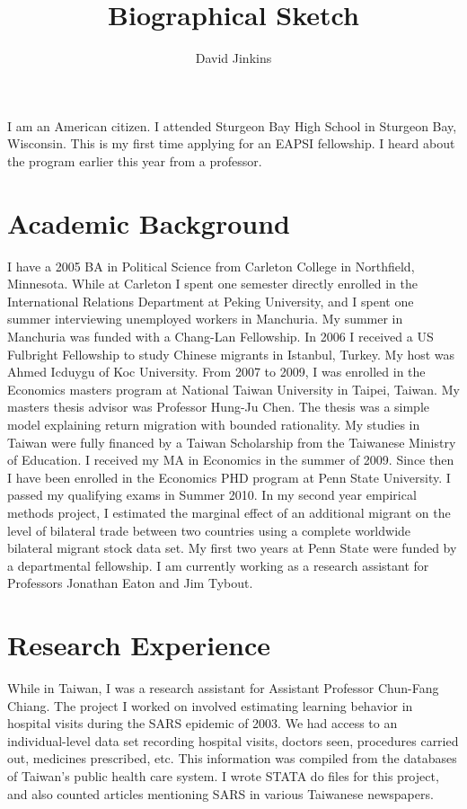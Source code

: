 \documentclass[a4paper,10pt]{article}
\title{Biographical Sketch}
\author{David Jinkins}
\begin{document}
\maketitle

I am an American citizen.  I attended Sturgeon Bay High School in Sturgeon Bay, Wisconsin.  This is my first time applying for an EAPSI fellowship.  I heard about the program earlier this year from a professor.    
\section*{Academic Background}
I have a 2005 BA in Political Science from Carleton College in Northfield, Minnesota.  While at Carleton I spent one semester directly enrolled in the International Relations Department at Peking University, and I spent one summer interviewing unemployed workers in Manchuria.  My summer in Manchuria was funded with a Chang-Lan Fellowship.  In 2006 I received a US Fulbright Fellowship to study Chinese migrants in Istanbul, Turkey.  My host was Ahmed Icduygu of Koc University.  From 2007 to 2009, I was enrolled in the Economics masters program at National Taiwan University in Taipei, Taiwan.  My masters thesis advisor was Professor Hung-Ju Chen.  The thesis was a simple model explaining return migration with bounded rationality.  My studies in Taiwan were fully financed by a Taiwan Scholarship from the Taiwanese Ministry of Education.  I received my MA in Economics in the summer of 2009. Since then I have been enrolled in the Economics PHD program at Penn State University.  I passed my qualifying exams in Summer 2010.  In my second year empirical methods project, I estimated the marginal effect of an additional migrant on the level of bilateral trade between two countries using a complete worldwide bilateral migrant stock data set.  My first two years at Penn State were funded by a departmental fellowship.  I am currently working as a research assistant for Professors Jonathan Eaton and Jim Tybout.           

\section*{Research Experience}
While in Taiwan, I was a research assistant for Assistant Professor Chun-Fang Chiang.  The project I worked on involved estimating learning behavior in hospital visits during the SARS epidemic of 2003.  We had access to an individual-level data set recording hospital visits, doctors seen, procedures carried out, medicines prescribed, etc.  This information was compiled from the databases of Taiwan's public health care system.  I wrote STATA do files for this project, and also counted articles mentioning SARS in various Taiwanese newspapers.
\end{document}
